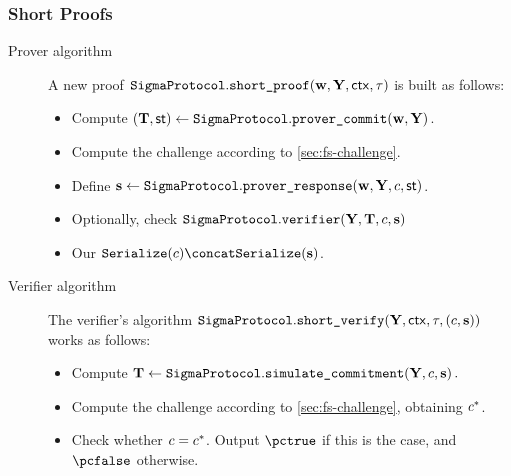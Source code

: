 \documentclass[runningheads,11pt]{article}
\begin{document}
\subsubsection{Short Proofs}
\begin{description}
\item[Prover algorithm]
A new proof $\texttt{SigmaProtocol}.\texttt{short\_proof}(\mathbf {w}, \mathbf {Y},\mathsf{ctx}, \tau)$ is built as follows:
\begin{itemize}
  \item
    Compute $(\mathbf {T},\mathsf{st})\gets\texttt{SigmaProtocol}.\texttt{prover\_commit}(\mathbf {w}, \mathbf {Y})$.
  \item
    Compute the challenge according to \cref{sec:fs-challenge}.
  \item
    Define $\mathbf {s}\gets\texttt{SigmaProtocol}.\texttt{prover\_response}(\mathbf {w},\mathbf {Y}, c,\mathsf{st})$.
    \item Optionally, check $\texttt{SigmaProtocol}.\texttt{verifier}(\mathbf {Y}, \mathbf {T}, c, \mathbf {s})$
  \item
  Our $\serialize(c) \concat \serialize(\vec s)$.
\end{itemize}
\item[Verifier algorithm] The verifier's algorithm $\texttt{SigmaProtocol}.\texttt{short\_verify}(\mathbf {Y}, \mathsf{ctx}, \tau, (c, \mathbf {s}))$ works as follows:
\begin{itemize}
  \item Compute $\mathbf {T} \gets \texttt{SigmaProtocol}.\texttt{simulate\_commitment}(\mathbf{Y}, c, \mathbf {s})\,.$

  \item
    Compute the challenge according to \cref{sec:fs-challenge}, obtaining $c^*$.
  \item
  Check whether $c=c^*$.
  Output $\accept$ if this is the case, and $\reject$ otherwise.
\end{itemize}
\end{description}
\end{document}
